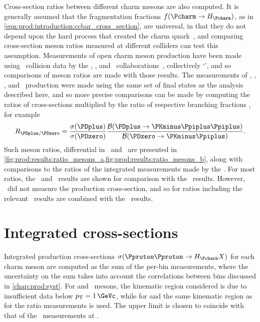 Cross-section ratios between different charm mesons are also computed.
It is generally assumed that the fragmentation fractions $f(\cToHc)$, as in 
\cref{eqn:prod:introduction:ccbar_cross_section}, are universal, in that they 
do not depend upon the hard process that created the charm 
quark~\cite{PDG2008,Lisovyi:2015uqa}, and comparing cross-section meson ratios 
measured at different colliders can test this assumption.
Measurements of open charm meson production have been made using \epem\ 
collision data by the \babar, \belle, and \cleo\ 
collaborations~\cite{Artuso:2004pj,Seuster:2005tr,Aubert:2002ue}, collectively 
`\bfactories', and so comparisons of meson ratios are made with those results.
The \bfactory measurements of \PDzero, \PDplus, \PDsplus, and \PDstarp\ 
production were made using the same set of final states as the analysis 
described here, and so more precise comparisons can be made by computing the 
ratios of cross-sections multiplied by the ratio of respective branching 
fractions \xsectimesbfrac, for example
\begin{equation*}
  \resultratio{\PDplus}{\PDzero} = \frac{%
    \xsec(\PDplus)
  }{%
    \xsec(\PDzero)
  }\frac{%
    \bfrac(\DpToKpipi)
  }{%
    \bfrac(\DzToKpi)
  }.
\end{equation*}
Such meson ratios, differential in \pT\ and \rapidity\, are presented in 
\cref{fig:prod:results:ratio_mesons_a,fig:prod:results:ratio_mesons_b}, along 
with comparisons to the ratios of the integrated measurements made by the 
\bfactories.
For most ratios, the \belle\ and \cleo\ results are shown for comparison with 
the \lhcb\ results.
However, \cleo\ did not measure the \PDsplus production cross-section, and so 
for ratios including \PDsplus the relevant \cleo\ results are combined with the 
\babar\ \PDsplus results.

\section{Integrated cross-sections}
\label{chap:prod:results:integrated}

Integrated production cross-sections $\xsec(\ppToHc{}X)$ for each charm meson 
are computed as the sum of the per-bin measurements, where the uncertainty on 
the sum takes into account the correlations between bins discussed in 
\cref{chap:prod:syst}.
For \PDsplus and \PDstarp\ mesons, the kinematic region considered is 
\pTyrange{1}{8}{2}{4.5} due to insufficient data below $\pT = \SI{1}{\GeVc}$, 
while for \PDzero and \PDplus the same kinematic region as for the ratio 
measurements is used.
The upper limit is chosen to coincide with that of the \lhcb\ measurements at 
\sqrtseq{7}.

